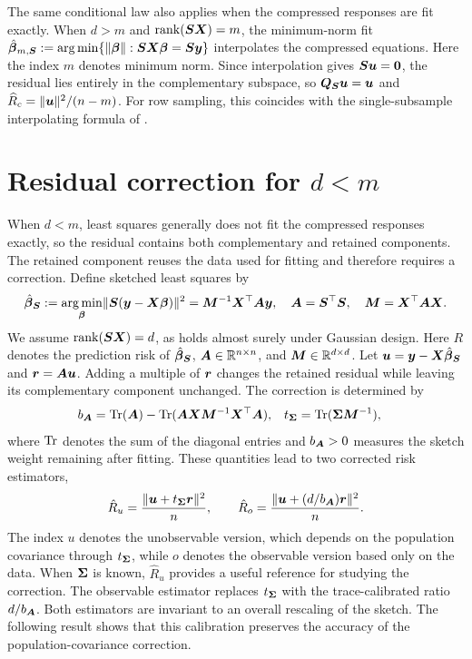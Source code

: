 \documentclass{article}
\theoremstyle{plain} %
\theoremstyle{definition} %
\theoremstyle{definition} %
\newcommand{\hR}{\hat{R}}
\begin{document}
The same conditional law also applies when the compressed responses are fit exactly. When $d>m$ and $\operatorname{rank}(\boldsymbol{S}\boldsymbol{X})=m$, the minimum-norm fit
$\hat{\boldsymbol{\beta}}{}_{m,\boldsymbol{S}}:=\mathop{\rm arg\, min}\{\lVert\boldsymbol{\beta}\rVert:\boldsymbol{S}\boldsymbol{X}\boldsymbol{\beta}=\boldsymbol{S}\boldsymbol{y}\}$
interpolates the compressed equations. Here the index $m$ denotes minimum norm. Since interpolation gives
$\boldsymbol{S}\boldsymbol{u}=\mathbf{0}$, the residual lies entirely in the complementary subspace, so $\boldsymbol{Q}_{\boldsymbol{S}}\boldsymbol{u}=\boldsymbol{u}$ and
$\widehat R_c=\lVert\boldsymbol{u}\rVert^2/(n-m)$.
For row sampling, this coincides with the single-subsample interpolating formula of \citet{bellec2025corrected}.



\section{Residual correction for \texorpdfstring{$d<m$}{d < m}}
\label{sec:underparameterized-transfer}

When $d<m$, least squares generally does not fit the compressed responses exactly, so the residual contains both complementary and retained components. The retained component reuses the data used for fitting and therefore requires a correction. Define sketched least squares by
\begin{align*}
 \hat{\boldsymbol{\beta}}{}_{\boldsymbol{S}}
 :=\mathop{\rm arg\, min}_{\boldsymbol{\beta}}\lVert\boldsymbol{S}(\boldsymbol{y}-\boldsymbol{X}\boldsymbol{\beta})\rVert^2
 =\boldsymbol{M}^{-1}\boldsymbol{X}^\top\boldsymbol{A}\boldsymbol{y},\quad
 \boldsymbol{A}=\boldsymbol{S}^\top\boldsymbol{S},\quad \boldsymbol{M}=\boldsymbol{X}^\top\boldsymbol{A}\boldsymbol{X}.
\end{align*}
We assume $\operatorname{rank}(\boldsymbol{S}\boldsymbol{X})=d$, as holds almost surely under Gaussian design. Here $R$ denotes the prediction risk of $\hat{\boldsymbol{\beta}}{}_{\boldsymbol{S}}$, $\boldsymbol{A}\in{\mathbb{R}}^{n\times n}$, and $\boldsymbol{M}\in{\mathbb{R}}^{d\times d}$. Let $\boldsymbol{u}=\boldsymbol{y}-\boldsymbol{X}\hat{\boldsymbol{\beta}}{}_{\boldsymbol{S}}$ and $\boldsymbol{r}=\boldsymbol{A}\boldsymbol{u}$. Adding a multiple of $\boldsymbol{r}$ changes the retained residual while leaving its complementary component unchanged. The correction is determined by
\begin{align*}
 b_{\boldsymbol{A}}&=\operatorname{Tr}(\boldsymbol{A})
       -\operatorname{Tr}(\boldsymbol{A}\boldsymbol{X}\boldsymbol{M}^{-1}\boldsymbol{X}^\top\boldsymbol{A}),&
 t_{\boldsymbol{\Sigma}}&=\operatorname{Tr}(\boldsymbol{\Sigma}\boldsymbol{M}^{-1}),
\end{align*}
where $\operatorname{Tr}$ denotes the sum of the diagonal entries and $b_{\boldsymbol{A}}>0$ measures the sketch weight remaining after fitting. These quantities lead to two corrected risk estimators,
\begin{align*}
 \hR_u=\frac{\norm{\bu+t_{\bSigma}\br}^2}{n},
 \qquad
 \hR_o=\frac{\norm{\bu+(d/b_{\bA})\br}^2}{n}.
\end{align*}
The index $u$ denotes the unobservable version, which depends on the population covariance through $t_{\boldsymbol{\Sigma}}$, while $o$ denotes the observable version based only on the data. When $\boldsymbol{\Sigma}$ is known, $\hR_u$ provides a useful reference for studying the correction. The observable estimator replaces $t_{\boldsymbol{\Sigma}}$ with the trace-calibrated ratio $d/b_{\boldsymbol{A}}$. Both estimators are invariant to an overall rescaling of the sketch. The following result shows that this calibration preserves the accuracy of the population-covariance correction.
\end{document}
